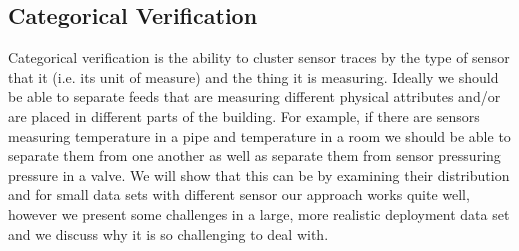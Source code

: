 \subsection{Categorical Verification}
Categorical verification is the ability to cluster sensor traces by the type of sensor that it (i.e. its unit of measure) and the thing it is measuring.
Ideally we should be able to separate feeds that are measuring different physical attributes and/or are placed in different parts of the building.
For example, if there are sensors measuring temperature in a pipe and temperature in a room we should be able to separate them from one another as well
as separate them from sensor pressuring pressure in a valve.  We will show that this can be by examining their distribution and for 
small data sets with different sensor our approach works quite well, however we present some challenges in a large, more realistic deployment
data set and we discuss why it is so challenging to deal with.



